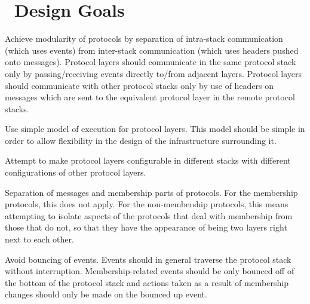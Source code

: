 %
%
%
\section{\ensemble\ Design Goals}

\item
Achieve modularity of protocols by separation of intra-stack communication
(which uses events) from inter-stack communication (which uses headers
pushed onto messages).  Protocol layers should communicate in the same
protocol stack only by passing/receiving events directly to/from adjacent
layers.  Protocol layers should communicate with other protocol stacks only
by use of headers on messages which are sent to the equivalent protocol
layer in the remote protocol stacks.
\item
Use simple model of execution for protocol layers.  This model should be
simple in order to allow flexibility in the design of the infrastructure
surrounding it.
\item
Attempt to make protocol layers configurable in different stacks with
different configurations of other protocol layers.
\item
Separation of messages and membership parts of protocols.  For the
membership protocols, this does not apply.  For the non-membership
protocols, this means attempting to isolate aspects of the protocols that
deal with membership from those that do not, so that they have the
appearance of being two layers right next to each other.
\item
Avoid bouncing of events.  Events should in general traverse the protocol
stack without interruption.  Membership-related events should be only
bounced off of the bottom of the protocol stack and actions taken as a
result of membership changes should only be made on the bounced up event.
